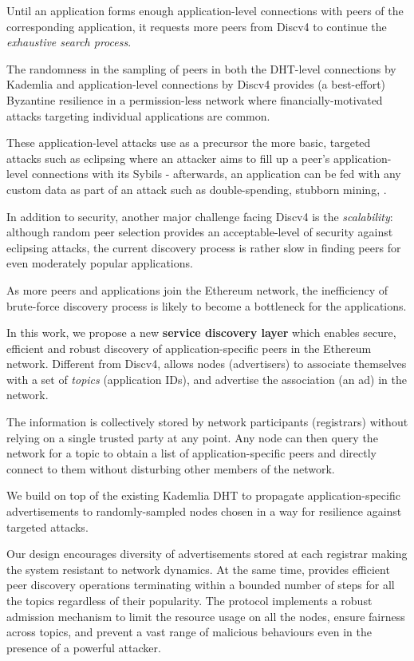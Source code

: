 Until an application forms enough application-level connections with peers of the corresponding application, it requests more peers from Discv4 to continue the \textit{exhaustive search process}.  

The randomness in the sampling of peers in both the DHT-level connections by Kademlia and application-level connections by Discv4 provides (a best-effort) Byzantine resilience in a permission-less network where financially-motivated attacks targeting individual applications are common. 

These application-level attacks use as a precursor the more basic, targeted attacks such as eclipsing where an attacker aims to fill up a peer's application-level connections with its Sybils - afterwards, an application can be fed with any custom data as part of an attack such as double-spending, stubborn mining, \etc. 

In addition to security, another major challenge facing Discv4 is the \textit{scalability}: although random peer selection provides an acceptable-level of security against eclipsing attacks, the current discovery process is rather slow in finding peers for even moderately popular applications. 

As more peers and applications join the Ethereum network, the inefficiency of brute-force discovery process is likely to become a bottleneck for the applications. 

 In this work, we propose a new \textbf{service discovery layer} which enables secure,  efficient and robust  discovery of application-specific peers in the Ethereum network.
Different from Discv4, \sysname allows nodes (\ie advertisers) to associate themselves with a set of \emph{topics} (\eg application IDs), and advertise the association (\ie an ad) in the network. 

The information is collectively stored by network participants (\ie registrars) without relying on a single trusted party at any point. Any node can then query the network for a topic to obtain a list of application-specific peers and directly connect to them without disturbing other members of the network. 

We build \sysname on top of the existing Kademlia DHT to propagate application-specific advertisements to randomly-sampled nodes chosen in a way for resilience against targeted attacks. 

Our design encourages diversity of advertisements stored at each registrar making the system resistant to network dynamics. At the same time, \sysname provides efficient peer discovery operations terminating within a bounded number of steps for all the topics regardless of their popularity. The protocol implements a robust admission mechanism to limit the resource usage on all the nodes, ensure fairness across topics, and prevent a vast range of malicious behaviours even in the presence of a powerful attacker.

